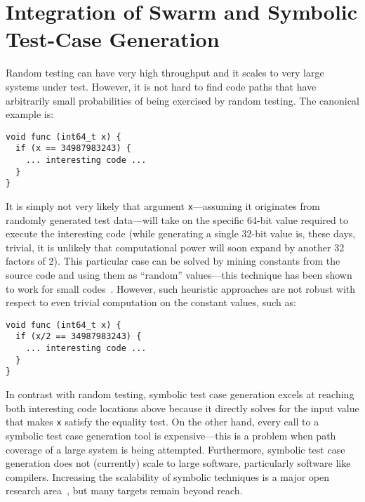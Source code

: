 \section{Integration of Swarm and Symbolic Test-Case Generation}
\label{sec:symbolic}

Random testing can have very high throughput and it scales to very
large systems under test.
%
However, it is not hard to find code paths that have arbitrarily small
probabilities of being exercised by random testing.
%
The canonical example is:

\begin{verbatim}
void func (int64_t x) {
  if (x == 34987983243) {
    ... interesting code ...
  }
}
\end{verbatim}

It is simply not very likely that argument \texttt{x}---assuming it
originates from randomly generated test data---will take on the
specific 64-bit value required to execute the interesting code (while
generating a single 32-bit value is, these days, trivial, it is
unlikely that computational power will soon expand by another 32
factors of 2).
%
This particular case can be solved by mining constants from the source
code and using them as ``random'' values---this technique has been
shown to work for small codes~\cite{leek07}.
%
However, such heuristic approaches are not robust with respect to even
trivial computation on the constant values, such as:

\begin{verbatim}
void func (int64_t x) {
  if (x/2 == 34987983243) {
    ... interesting code ...
  }
}
\end{verbatim}


In contrast with random testing, symbolic test case generation excels
at reaching both interesting code locations above because it directly solves
for the input value that makes \texttt{x} satisfy the equality test.
%
On the other hand, every call to a symbolic test case generation tool
is expensive---this is a problem when path coverage of a large system
is being attempted.
%
Furthermore, symbolic test case generation does not (currently) scale
to large software, particularly software like compilers.  Increasing
the scalability of symbolic techniques is a major open research
area~\cite{RWSet,WhiteBox,SMART,express}, but many targets remain beyond reach.
%
\iffalse
Compilers are, in fact, a bit of a worst-case scenario for symbolic
testcase generation:
\begin{itemize}
\item The frontend of a compiler typically contains a table-driven
  lexer and symbol-table lookup; the inverse problems involved in
  generating inputs that get through these are extraordinarily
  difficult.
\item The input to a compiler is highly structured, but the structure
  is somewhat implicit.  Asking a symbolic test case generation
  tool to reverse engineer this structure from scratch is perhaps
  too much to expect.
\end{itemize}
\fi


